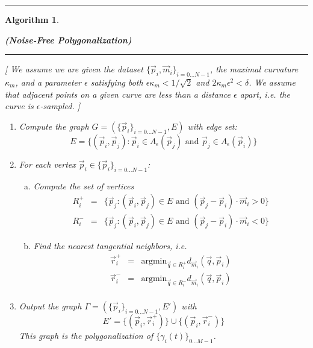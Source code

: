 \documentclass{article}
\newtheorem{algo}{Algorithm}
\numberwithin{cntr}{section}
\numberwithin{equation}{section}
\newcommand{\vp}[0]{{\vec{p}}}
\newcommand{\vq}[0]{{\vec{q}}}
\newcommand{\vr}[0]{{\vec{r}}}
\newcommand{\vm}[0]{{\vec{m}}}
\newcommand{\Oto}[1]{{0 \ldots #1-1}}
\newcommand{\OtoN}{{0 \ldots N-1}}
\newcommand{\pointData}{{ \{ \vp_{i} \}_{i=\OtoN} }}
\newcommand{\allData}{{ \{ \vp_{i}, \vm_{i} \}_{i=\OtoN} }}
\newcommand{\curveSet}{{ \{ \gamma_i(t) \}_{\Oto{M}}}}
\newcommand{\allowed}[2]{ { A_{#1}(#2) } }
\newcommand{\curvemax}{{\kappa_{m}}}
\newcommand{\curvesep}{{\delta}}
\begin{document}
\vspace{.2in}

\hrule
\begin{algo}
  \label{algo:polygonalization}
  \begin{center} {\bf (Noise-Free Polygonalization)}
  \end{center}

\vspace{.1in}

\hrule

\vspace{.2in}

[ We assume we are given
the dataset $\allData$,
the maximal curvature $\curvemax$, and
a parameter $\epsilon$ satisfying both
$\epsilon \curvemax < 1/\sqrt{2}$ and $2 \curvemax \epsilon^{2} < \curvesep$.
We assume that adjacent points on a given curve
are less than a distance $\epsilon$ apart, i.e. the curve is
$\epsilon$-sampled. ]

\vspace{.1in}

  \begin{enumerate}
  \item Compute the graph $G = (\pointData, E)$ with edge set:
    \begin{equation*}
      E = \{ (\vp_{i},\vp_{j}) : \vp_{i} \in \allowed{\epsilon}{\vp_{j}} \textrm{~and~} \vp_{j} \in \allowed{\epsilon}{\vp_{i}}\}
    \end{equation*}
  \item For each vertex $\vp_{i} \in \pointData$:
    \begin{enumerate}[a.]
    \item Compute the set of vertices
      \begin{eqnarray*}
        R^{+}_{i} &=& \{ \vp_{j} : (\vp_{i}, \vp_{j}) \in E \textrm{~and~} (\vp_{j}-\vp_{i}) \cdot \vm_{i} > 0 \}\\
        R^{-}_{i} &=& \{ \vp_{j} : (\vp_{i}, \vp_{j}) \in E \textrm{~and~} (\vp_{j}-\vp_{i}) \cdot \vm_{i} < 0 \}
      \end{eqnarray*}
    \item Find the nearest tangential neighbors, i.e.
      \begin{eqnarray*}
        \vr^{+}_{i} &=& \textrm{argmin}_{\vq \in R^{+}_{i}} d_{\vm_{i}}(\vq, \vp_{i})\\
        \vr^{-}_{i} &=& \textrm{argmin}_{\vq \in R^{-}_{i}} d_{\vm_{i}}(\vq, \vp_{i})\\
      \end{eqnarray*}
    \end{enumerate}
  \item Output the graph $\Gamma = ( \pointData, E')$ with
    \begin{equation*}
      E' = \{ (\vp_{i}, \vr^{+}_{i}) \} \cup \{ (\vp_{i}, \vr^{-}_{i}) \}
    \end{equation*}
    This graph is the polygonalization of $\curveSet$.
  \end{enumerate}

\end{algo}
\end{document}
